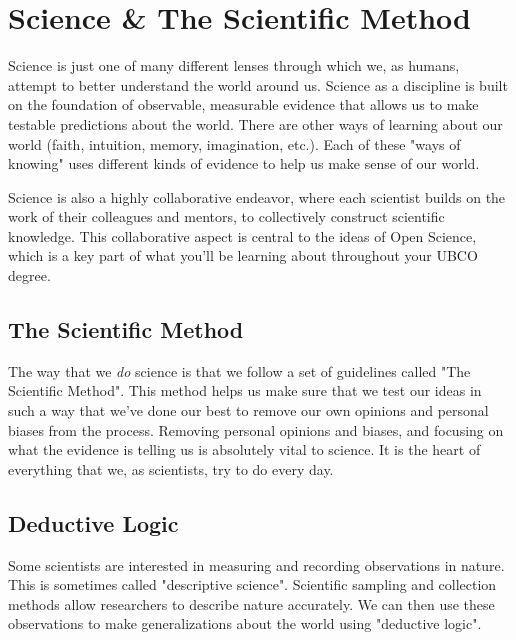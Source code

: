 \documentclass[
]{book}
\begin{document}
\hypertarget{science-the-scientific-method}{%
\section*{Science \& The Scientific Method}\label{science-the-scientific-method}}

Science is just one of many different lenses through which we, as humans, attempt to better understand the world around us. Science as a discipline is built on the foundation of observable, measurable evidence that allows us to make testable predictions about the world. There are other ways of learning about our world (faith, intuition, memory, imagination, etc.). Each of these "ways of knowing" uses different kinds of evidence to help us make sense of our world.

Science is also a highly collaborative endeavor, where each scientist builds on the work of their colleagues and mentors, to collectively construct scientific knowledge. This collaborative aspect is central to the ideas of Open Science, which is a key part of what you'll be learning about throughout your UBCO degree.

\hypertarget{the-scientific-method}{%
\subsection*{The Scientific Method}\label{the-scientific-method}}

The way that we \emph{do} science is that we follow a set of guidelines called "The Scientific Method". This method helps us make sure that we test our ideas in such a way that we've done our best to remove our own opinions and personal biases from the process. Removing personal opinions and biases, and focusing on what the evidence is telling us is absolutely vital to science. It is the heart of everything that we, as scientists, try to do every day.

\hypertarget{deductive-logic}{%
\subsection*{Deductive Logic}\label{deductive-logic}}

Some scientists are interested in measuring and recording observations in nature. This is sometimes called "descriptive science". Scientific sampling and collection methods allow researchers to describe nature accurately. We can then use these observations to make generalizations about the world using "deductive logic".
\end{document}
